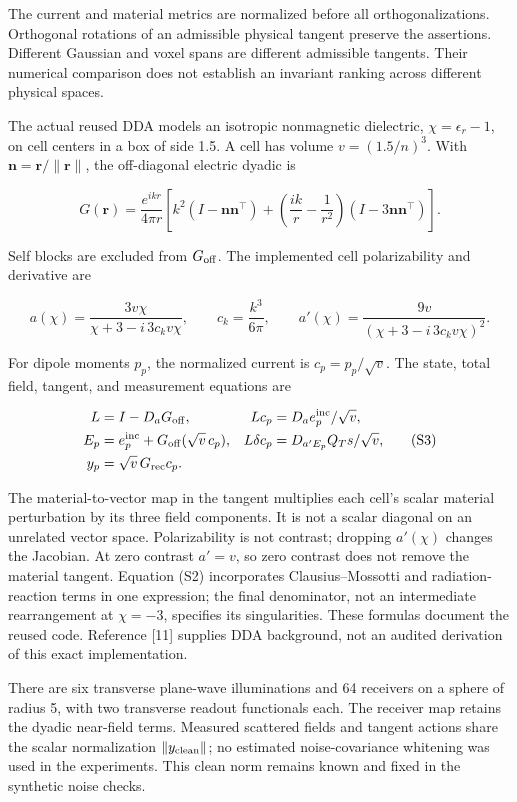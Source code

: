 \documentclass[11pt]{article}
\begin{document}
The current and material metrics are normalized before all orthogonalizations. Orthogonal rotations of an admissible physical tangent preserve the assertions. Different Gaussian and voxel spans are different admissible tangents. Their numerical comparison does not establish an invariant ranking across different physical spaces.

The actual reused DDA models an isotropic nonmagnetic dielectric, \(\chi=\epsilon_r-1\), on cell centers in a box of side 1.5. A cell has volume \(v=(1.5/n)^3\). With \(\boldsymbol n=\boldsymbol r/\|\boldsymbol r\|\), the off-diagonal electric dyadic is

\[
G(\boldsymbol r)=\frac{e^{ikr}}{4\pi r}
\left[k^2(I-\boldsymbol n\boldsymbol n^\top)
+\left(\frac{ik}{r}-\frac1{r^2}\right)(I-3\boldsymbol n\boldsymbol n^\top)\right]. \tag{S1}
\]

Self blocks are excluded from \(G_{\rm off}\). The implemented cell polarizability and derivative are

\[
a(\chi)=\frac{3v\chi}{\chi+3-i\,3c_kv\chi},\qquad
c_k=\frac{k^3}{6\pi},\qquad
a'(\chi)=\frac{9v}{(\chi+3-i\,3c_kv\chi)^2}. \tag{S2}
\]

For dipole moments \(p_p\), the normalized current is \(c_p=p_p/\sqrt v\). The state, total field, tangent, and measurement equations are

\[
\begin{aligned}
L&=I-D_aG_{\rm off},&
Lc_p&=D_ae_p^{\rm inc}/\sqrt v,\\
E_p&=e_p^{\rm inc}+G_{\rm off}(\sqrt v\,c_p),&
L\delta c_p&=D_{a'E_p}Q_Ts/\sqrt v,\\
y_p&=\sqrt v\,G_{\rm rec}c_p.
\end{aligned} \tag{S3}
\]

The material-to-vector map in the tangent multiplies each cell's scalar material perturbation by its three field components. It is not a scalar diagonal on an unrelated vector space. Polarizability is not contrast; dropping \(a'(\chi)\) changes the Jacobian. At zero contrast \(a'=v\), so zero contrast does not remove the material tangent. Equation (S2) incorporates Clausius--Mossotti and radiation-reaction terms in one expression; the final denominator, not an intermediate rearrangement at \(\chi=-3\), specifies its singularities. These formulas document the reused code. Reference [11] supplies DDA background, not an audited derivation of this exact implementation.

There are six transverse plane-wave illuminations and 64 receivers on a sphere of radius 5, with two transverse readout functionals each. The receiver map retains the dyadic near-field terms. Measured scattered fields and tangent actions share the scalar normalization \(\|y_{\rm clean}\|\); no estimated noise-covariance whitening was used in the experiments. This clean norm remains known and fixed in the synthetic noise checks.
\end{document}
